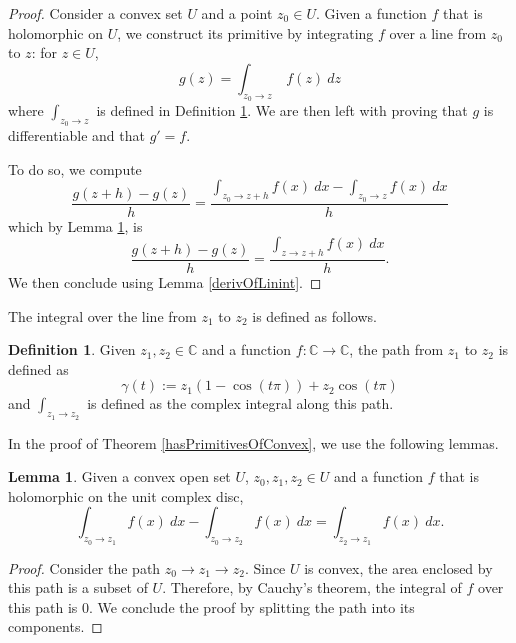 \documentclass{report}
\theoremstyle{definition}
\newtheorem{definition}{Definition}
\newtheorem{lemma}{Lemma}
\begin{document}
\begin{proof}
  Consider a convex set $U$ and a point $z_0\in U$.
  Given a function $f$ that is holomorphic on $U$, we construct its primitive by integrating $f$ over a line from $z_0$ to $z$: for $z\in U$,
  \begin{equation}
    g(z)=\int_{z_0\to z}\ f(z)\ dz
  \end{equation}
  where $\int_{z_0\to z}$ is defined in Definition \ref{linint}.
  We are then left with proving that $g$ is differentiable and that $g'=f$.

  To do so, we compute
  \begin{equation}
    \frac{g(z+h)-g(z)}h
    =
    \frac{\int_{z_0\to z+h} f(x)\ dx-\int_{z_0\to z} f(x)\ dx}h
  \end{equation}
  which by Lemma \ref{diffOfIntegrals}, is
  \begin{equation}
    \frac{g(z+h)-g(z)}h
    =
    \frac{\int_{z\to z+h} f(x)\ dx}h
    .
  \end{equation}
  We then conclude using Lemma \ref{derivOfLinint}.
\end{proof}

The integral over the line from $z_1$ to $z_2$ is defined as follows.

\begin{definition}
  \label{linint}
  \leanok
  Given $z_1,z_2\in\mathbb C$ and a function $f:\mathbb C\to\mathbb C$, the path from $z_1$ to $z_2$ is defined as
  \begin{equation}
    \gamma(t):=z_1(1-\cos(t\pi))+z_2\cos(t\pi)
  \end{equation}
  and $\int_{z_1\to z_2}$ is defined as the complex integral along this path.
\end{definition}

In the proof of Theorem \ref{hasPrimitivesOfConvex}, we use the following lemmas.

\begin{lemma}
  \label{diffOfIntegrals}
  \leanok
  Given a convex open set $U$, $z_0,z_1,z_2\in U$ and a function $f$ that is holomorphic on the unit complex disc,
  \begin{equation}
    \int_{z_0\to z_1} f(x)\ dx
    -
    \int_{z_0\to z_2} f(x)\ dx
    =
    \int_{z_2\to z_1} f(x)\ dx
    .
  \end{equation}
\end{lemma}

\begin{proof}
  Consider the path $z_0\to z_1\to z_2$.
  Since $U$ is convex, the area enclosed by this path is a subset of $U$.
  Therefore, by Cauchy's theorem, the integral of $f$ over this path is 0.
  We conclude the proof by splitting the path into its components.
\end{proof}
\end{document}
